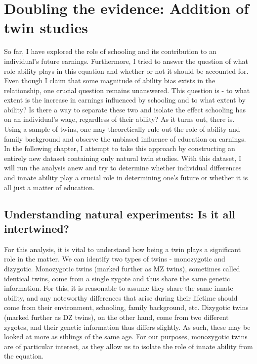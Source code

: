 \chapter{Doubling the evidence: Addition of twin studies}
\label{chap:seven}

So far, I have explored the role of schooling and its contribution to an individual's future earnings. Furthermore, I tried to answer the question of what role ability plays in this equation and whether or not it should be accounted for.
Even though I claim that some magnitude of ability bias exists in the relationship, one crucial question remains unanswered. This question is - to what extent is the increase in earnings influenced by schooling and to what extent by ability? Is there a way to separate these two and isolate the effect schooling has on an individual's wage, regardless of their ability? As it turns out, there is. Using a sample of twins, one may theoretically rule out the role of ability and family background and observe the unbiased influence of education on earnings. In the following chapter, I attempt to take this approach by constructing an entirely new dataset containing only natural twin studies. With this dataset, I will run the analysis anew and try to determine whether individual differences and innate ability play a crucial role in determining one's future or whether it is all just a matter of education.


\section{Understanding natural experiments: Is it all intertwined?}
\label{sec:twins_literature}

For this analysis, it is vital to understand how being a twin plays a significant role in the matter. We can identify two types of twins - monozygotic and dizygotic. Monozygotic twins (marked further as MZ twins), sometimes called identical twins, come from a single zygote and thus share the same genetic information. For this, it is reasonable to assume they share the same innate ability, and any noteworthy differences that arise during their lifetime should come from their environment, schooling, family background, etc. Dizygotic twins (marked further as DZ twins), on the other hand, come from two different zygotes, and their genetic information thus differs slightly. As such, these may be looked at more as siblings of the same age. For our purposes, monozygotic twins are of particular interest, as they allow us to isolate the role of innate ability from the equation.

